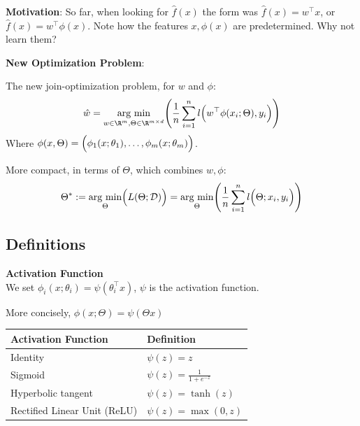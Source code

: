\textbf{Motivation}: So far, when looking for $\hat{f}(x)$ the form was $\hat{f}(x)=w^\top x$, or $\hat{f}(x) = w^\top \phi(x)$. 
Note how the features $x, \phi(x)$ are predetermined. Why not learn them?

\textbf{New Optimization Problem}:

The new join-optimization problem, for $w$ and $\phi$:\\
$$
    \hat{w} = \underset{w\in\R^m,\Theta\in\R^{m\times d}}{\text{arg min}}\Biggl( \frac{1}{n}\sum_{i=1}^n l\Bigl( w^\top \phi(x_i;\Theta),y_i \Bigr) \Biggr)
$$
Where $\phi(x,\Theta) = \Bigl( \phi_1(x;\theta_1),\ldots,\phi_m(x;\theta_m) \Bigr)$.\\

More compact, in terms of $\Theta$, which combines $w, \phi$:
$$
    \Theta^* := \underset{\Theta}{\text{arg min}}\Bigl( L(\Theta; \mathcal{D}) \Bigr) = \underset{\Theta}{\text{arg min}} \Biggl( \frac{1}{n} \sum_{i=1}^{n} l\Bigl( \Theta;x_i,y_i \Bigr) \Biggr)
$$

\subsection{Definitions}

 \textbf{Activation Function}\\
We set $\phi_i(x;\theta_i) = \psi(\theta_i^\top x)$, $\psi$ is the activation function.\\

{\footnotesize
    \notation More concisely, $\phi(x;\Theta) = \psi(\Theta x)$
}

\begin{center}
    \begin{tabular}{ll}
        \textbf{Activation Function}    & \textbf{Definition}               \\
        \hline
        Identity                        & $\psi(z) = z$                     \\
        Sigmoid                         & $\psi(z) = \frac{1}{1+e^{-z}}$    \\
        Hyperbolic tangent              & $\psi(z) = \tanh(z)$              \\
        Rectified Linear Unit (ReLU)    & $\psi(z) = \max(0,z)$ 
    \end{tabular}
\end{center}

